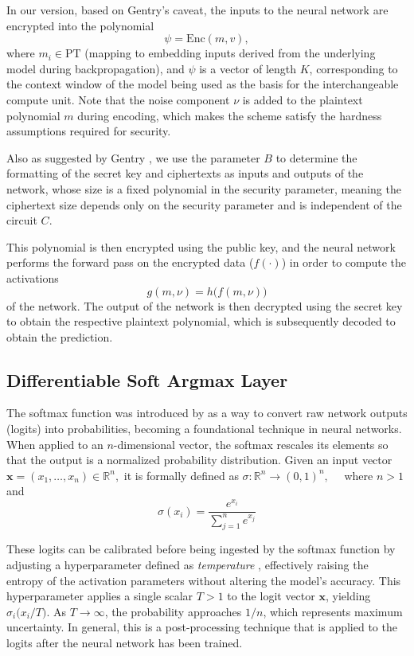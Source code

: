 \documentclass{article}
\begin{document}
In our version, based on Gentry's caveat, the inputs to the neural network are encrypted into the polynomial 
\[
\psi = \mathrm{Enc}(m, v),
\]
where $m_i \in \text{PT}$ (mapping to embedding inputs derived from the underlying model during backpropagation), and $\psi$ is a vector of length $K$, corresponding to the context window of the model being used as the basis for the interchangeable compute unit. Note that the noise component $\nu$ is added to the plaintext polynomial $m$ during encoding, which makes the scheme satisfy the hardness assumptions required for security.

Also as suggested by Gentry \cite[p.~6]{gentry2009fully}, we use the parameter $B$ to determine the formatting of the secret key and ciphertexts as inputs and outputs of the network, whose size is a fixed polynomial in the security parameter, meaning the ciphertext size depends only on the security parameter and is independent of the circuit $C$.

This polynomial is then encrypted using the public key, and the neural network performs the forward pass on the encrypted data ($f(\cdot)$) in order to compute the activations 
\[
g(m, \nu) = h\bigl(f(m, \nu)\bigr)
\]
of the network. The output of the network is then decrypted using the secret key to obtain the respective plaintext polynomial, which is subsequently decoded to obtain the prediction.

\subsection{Differentiable Soft Argmax Layer}

The softmax function was introduced by \cite{bridle1990probabilistic} as a way to convert raw network outputs (logits) into probabilities, becoming a foundational technique in neural networks. When applied to an $n$-dimensional vector, the softmax rescales its elements so that the output is a normalized probability distribution. Given an input vector 
$
\mathbf{x} = (x_1, \dots, x_n) \in \mathbb{R}^n,
$
it is formally defined as 
$
\sigma : \mathbb{R}^n \to (0,1)^n,
\quad $ where $n > 1$ and
\[
\sigma(x_i) = \frac{e^{x_i}}{\sum_{j=1}^{n} e^{x_j}}
\]


These logits can be calibrated before being ingested by the softmax function by adjusting a hyperparameter defined as \emph{temperature} \cite{guo2017calibration}, effectively raising the entropy of the activation parameters without altering the model's accuracy. This hyperparameter applies a single scalar $T > 1$ to the logit vector $\mathbf{x}$, yielding $\sigma_i\bigl(x_i / T\bigr).$
As $T \to \infty$, the probability approaches $1/n$, which represents maximum uncertainty. In general, this is a post-processing technique that is applied to the logits after the neural network has been trained.
\end{document}
